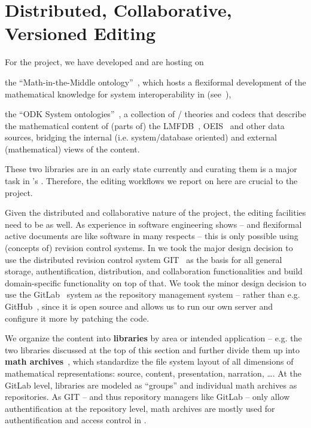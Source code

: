 \section{Distributed, Collaborative, Versioned Editing}\label{sec:editing}

For the \pn project, we have developed and are hosting on \sys
\begin{compactenum}
\item the ``Math-in-the-Middle ontology''~\cite{MitM:on}, which hosts a flexiformal
  development of the mathematical knowledge for system interoperability in \pn
  (see~\cite{DehKohKon:iop16,ODK-D6.2}),
\item the ``ODK System ontologies''~\cite{ODKsysonto:on}, a collection of \omdoc/\mmt
  theories and codecs that describe the mathematical content of (parts of) the
  LMFDB~\cite{lmfdb:on}, OEIS~\cite{oeis} and other data sources, bridging the internal
  (i.e. system/database oriented) and external (mathematical) views of the content.
\end{compactenum}
These two \sys libraries are in an early state currently and curating them is a major task
in \pn's . Therefore, the editing workflows we
report on here are crucial to the \pn project.

Given the distributed and collaborative nature of the \pn project, the editing facilities
need to be as well. As experience in software engineering shows -- and flexiformal active
documents are like software in many respects -- this is only possible using (concepts of)
revision control systems. In \sys we took the major design decision to use the distributed
revision control system GIT~\cite{GIT:on} as the basis for all general storage,
authentification, distribution, and collaboration functionalities and build
domain-specific functionality on top of that. We took the minor design decision to use the
GitLab~\cite{GitLab:on} system as the repository management system -- rather than e.g.
GitHub~\cite{GitHub:on}, since it is open source and allows us to run our own server and
configure it more by patching the code.

We organize the content into \textbf{libraries} by area or intended application --
e.g. the two libraries discussed at the top of this section and further divide them up
into \textbf{math archives}~\cite{HorIacJuc:cscpnrr11}, which standardize the file system
layout of all dimensions of mathematical representations: source, content, presentation,
narration, \ldots. At the GitLab level, libraries are modeled as ``groups'' and individual
math archives as repositories. As GIT -- and thus repository managers like GitLab -- only
allow authentification at the repository level, math archives are mostly used for
authentification and access control in \sys.

